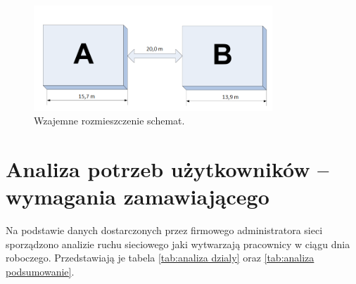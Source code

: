 \documentclass{report}
\begin{document}
\begin{figure}[H]
  \centering
      \includegraphics[width=0.8\textwidth]{./obrazki/rozmieszczenie_budynkow.jpeg}
    \caption{Wzajemne rozmieszczenie schemat.}
\end{figure}



\chapter{Analiza potrzeb użytkowników – wymagania zamawiającego}
Na podstawie danych dostarczonych przez firmowego administratora sieci sporządzono analizie ruchu sieciowego jaki wytwarzają
pracownicy w ciągu dnia roboczego. Przedstawiają je tabela 
\ref{tab:analiza dzialy} oraz \ref{tab:analiza podsumowanie}.
\end{document}
